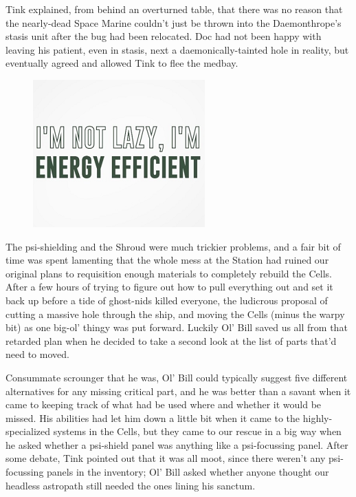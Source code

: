 Tink explained, from behind an overturned table, that there was no reason that the nearly-dead Space Marine couldn’t just be thrown into the Daemonthrope’s stasis unit after the bug had been relocated. 
Doc had not been happy with leaving his patient, even in stasis, next a daemonically-tainted hole in reality, but eventually agreed and allowed Tink to flee the medbay.

\begin{figure}
	\begin{center}
		\includegraphics[width=\figwidth]{pics/15/44.png}
	\end{center}
\end{figure}
The psi-shielding and the Shroud were much trickier problems, and a fair bit of time was spent lamenting that the whole mess at the Station had ruined our original plans to requisition enough materials to completely rebuild the Cells. 
After a few hours of trying to figure out how to pull everything out and set it back up before a tide of ghost-nids killed everyone, the ludicrous proposal of cutting a massive hole through the ship, and moving the Cells (minus the warpy bit)  as one big-ol' thingy was put forward. 
Luckily Ol’ Bill saved us all from that retarded plan when he decided to take a second look at the list of parts that'd need to moved.

Consummate scrounger that he was, Ol' Bill could typically suggest five different alternatives for any missing critical part, and he was better than a savant when it came to keeping track of what had be used where and whether it would be missed. 
His abilities had let him down a little bit when it came to the highly-specialized systems in the Cells, but they came to our rescue in a big way when he asked whether a psi-shield panel was anything like a psi-focussing panel. 
After some debate, Tink pointed out that it was all moot, since there weren't any psi-focussing panels in the inventory; 
Ol' Bill asked whether anyone thought our headless astropath still needed the ones lining his sanctum.

